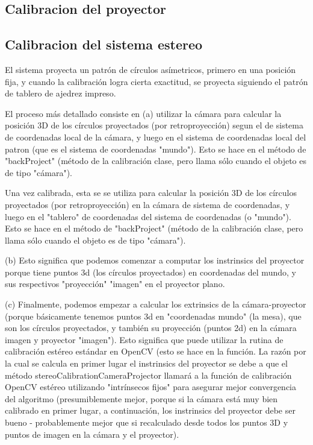 \subsection{Calibracion del proyector}
\subsection{Calibracion del sistema estereo}
El sistema proyecta un patrón de círculos asímetricos, primero en una posición fija, y cuando la calibración logra cierta exactitud, se proyecta siguiendo el patrón de tablero de ajedrez impreso. 

El proceso más detallado consiste en (a) utilizar la cámara para calcular la posición 3D de los círculos proyectados (por retroproyección) segun el  de sistema de coordenadas local de la cámara, y luego en el sistema de coordenadas local del patron (que es el sistema de coordenadas "mundo"). Esto se hace en el método de "backProject" (método de la calibración clase, pero llama sólo cuando el objeto es de tipo "cámara"). 

Una vez calibrada, esta se se utiliza para calcular la posición 3D de los círculos proyectados (por retroproyección) en la cámara de sistema de coordenadas, y luego en el "tablero" de coordenadas del sistema de coordenadas (o "mundo"). Esto se hace en el método de "backProject" (método de la calibración clase, pero llama sólo cuando el objeto es de tipo "cámara"). 

(b) Esto significa que podemos comenzar a computar los instrinsics del proyector porque tiene puntos 3d (los círculos proyectados) en coordenadas del mundo, y sus respectivos "proyección" "imagen" en el proyector plano. 

(c) Finalmente, podemos empezar a calcular los extrinsics de la cámara-proyector (porque básicamente tenemos puntos 3d en "coordenadas mundo" (la mesa), que son los círculos proyectados, y también su proyección (puntos 2d) en la cámara imagen y proyector "imagen"). Esto significa que puede utilizar la rutina de calibración estéreo estándar en OpenCV (esto se hace en la función. La razón por la cual se calcula en primer lugar el instrinsics del proyector se debe a que el método stereoCalibrationCameraProjector llamará a la función de calibración OpenCV estéreo utilizando "intrínsecos fijos" para asegurar mejor convergencia del algoritmo (presumiblemente mejor, porque si la cámara está muy bien calibrado en primer lugar, a continuación, los instrinsics del proyector debe ser bueno - probablemente mejor que si recalculado desde todos los puntos 3D y puntos de imagen en la cámara y el proyector). 


